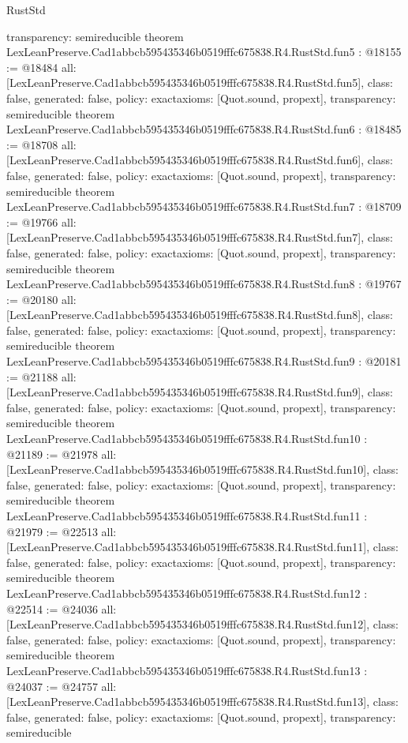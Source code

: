 \begin{lexlean}{RustStd}
\begin{coremodule}
{  transparency: semireducible
}
theorem LexLeanPreserve.Cad1abbcb595435346b0519fffc675838.R4.RustStd.fun5 : @18155 := @18484 {
  all: [LexLeanPreserve.Cad1abbcb595435346b0519fffc675838.R4.RustStd.fun5],
  class: false,
  generated: false,
  policy: exact{axioms: [Quot.sound, propext]},
  transparency: semireducible
}
theorem LexLeanPreserve.Cad1abbcb595435346b0519fffc675838.R4.RustStd.fun6 : @18485 := @18708 {
  all: [LexLeanPreserve.Cad1abbcb595435346b0519fffc675838.R4.RustStd.fun6],
  class: false,
  generated: false,
  policy: exact{axioms: [Quot.sound, propext]},
  transparency: semireducible
}
theorem LexLeanPreserve.Cad1abbcb595435346b0519fffc675838.R4.RustStd.fun7 : @18709 := @19766 {
  all: [LexLeanPreserve.Cad1abbcb595435346b0519fffc675838.R4.RustStd.fun7],
  class: false,
  generated: false,
  policy: exact{axioms: [Quot.sound, propext]},
  transparency: semireducible
}
theorem LexLeanPreserve.Cad1abbcb595435346b0519fffc675838.R4.RustStd.fun8 : @19767 := @20180 {
  all: [LexLeanPreserve.Cad1abbcb595435346b0519fffc675838.R4.RustStd.fun8],
  class: false,
  generated: false,
  policy: exact{axioms: [Quot.sound, propext]},
  transparency: semireducible
}
theorem LexLeanPreserve.Cad1abbcb595435346b0519fffc675838.R4.RustStd.fun9 : @20181 := @21188 {
  all: [LexLeanPreserve.Cad1abbcb595435346b0519fffc675838.R4.RustStd.fun9],
  class: false,
  generated: false,
  policy: exact{axioms: [Quot.sound, propext]},
  transparency: semireducible
}
theorem LexLeanPreserve.Cad1abbcb595435346b0519fffc675838.R4.RustStd.fun10 : @21189 := @21978 {
  all: [LexLeanPreserve.Cad1abbcb595435346b0519fffc675838.R4.RustStd.fun10],
  class: false,
  generated: false,
  policy: exact{axioms: [Quot.sound, propext]},
  transparency: semireducible
}
theorem LexLeanPreserve.Cad1abbcb595435346b0519fffc675838.R4.RustStd.fun11 : @21979 := @22513 {
  all: [LexLeanPreserve.Cad1abbcb595435346b0519fffc675838.R4.RustStd.fun11],
  class: false,
  generated: false,
  policy: exact{axioms: [Quot.sound, propext]},
  transparency: semireducible
}
theorem LexLeanPreserve.Cad1abbcb595435346b0519fffc675838.R4.RustStd.fun12 : @22514 := @24036 {
  all: [LexLeanPreserve.Cad1abbcb595435346b0519fffc675838.R4.RustStd.fun12],
  class: false,
  generated: false,
  policy: exact{axioms: [Quot.sound, propext]},
  transparency: semireducible
}
theorem LexLeanPreserve.Cad1abbcb595435346b0519fffc675838.R4.RustStd.fun13 : @24037 := @24757 {
  all: [LexLeanPreserve.Cad1abbcb595435346b0519fffc675838.R4.RustStd.fun13],
  class: false,
  generated: false,
  policy: exact{axioms: [Quot.sound, propext]},
  transparency: semireducible
}
\end{coremodule}
\end{lexlean}
